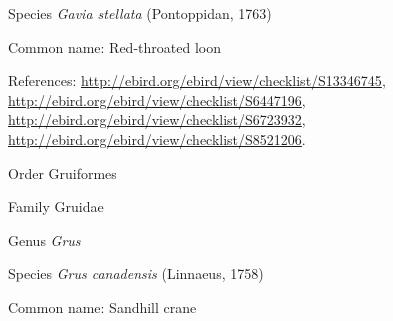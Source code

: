 \documentclass[9pt, article]{memoir}
\begin{document}
\begin{multicols}{2}
\vspace{6pt}\noindent\hspace{36pt}Species \textit{Gavia stellata} (Pontoppidan, 1763)


Common name: Red-throated loon

References: 
\url{http://ebird.org/ebird/view/checklist/S13346745}, 
\url{http://ebird.org/ebird/view/checklist/S6447196}, 
\url{http://ebird.org/ebird/view/checklist/S6723932}, 
\url{http://ebird.org/ebird/view/checklist/S8521206}.

\vspace{6pt}\noindent\hspace{18pt}Order Gruiformes


\vspace{6pt}\noindent\hspace{24pt}Family Gruidae


\vspace{6pt}\noindent\hspace{30pt}Genus \textit{Grus}


\vspace{6pt}\noindent\hspace{36pt}Species \textit{Grus canadensis} (Linnaeus, 1758)


Common name: Sandhill crane


\end{multicols}
\end{document}
